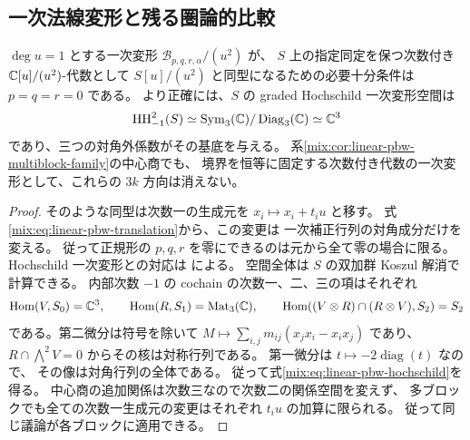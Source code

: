 \subsection{一次法線変形と残る圏論的比較}

\begin{proposition}[平行移動では消えない三方向]
\label{mix:prop:linear-pbw-first-normal-class}
$\deg u=1$ とする一次変形 $\mathcal B_{p,q,r,\alpha}/(u^2)$ が、
$S$ 上の指定同定を保つ次数付き $\mathbb C[u]/(u^2)$-代数として
$S[u]/(u^2)$ と同型になるための必要十分条件は $p=q=r=0$ である。
より正確には、$S$ の graded Hochschild 一次変形空間は
\begin{equation}\label{mix:eq:linear-pbw-hochschild}
 \operatorname{HH}^2_{-1}(S)
 \simeq \operatorname{Sym}_3(\mathbb C)/\operatorname{Diag}_3(\mathbb C)
 \simeq\mathbb C^3
\end{equation}
であり、三つの対角外係数がその基底を与える。
系\ref{mix:cor:linear-pbw-multiblock-family}の中心商でも、
境界を恒等に固定する次数付き代数の一次変形として、これらの $3k$ 方向は消えない。
\end{proposition}

\begin{proof}
そのような同型は次数一の生成元を $x_i\mapsto x_i+t_i u$ と移す。
式\eqref{mix:eq:linear-pbw-translation}から、この変更は
一次補正行列の対角成分だけを変える。
従って正規形の $p,q,r$ を零にできるのは元から全て零の場合に限る。
Hochschild 一次変形との対応は
\cite[Proposition~1.5(a)]{CMOBravermanGaitsgory}による。
空間全体は $S$ の双加群 Koszul 解消で計算できる。
内部次数 $-1$ の cochain の次数一、二、三の項はそれぞれ
\[
 \operatorname{Hom}(V,S_0)=\mathbb C^3,\qquad
 \operatorname{Hom}(R,S_1)=\operatorname{Mat}_3(\mathbb C),\qquad
 \operatorname{Hom}((V\otimes R)\cap(R\otimes V),S_2)=S_2
\]
である。第二微分は符号を除いて
$M\mapsto\sum_{i,j}m_{ij}(x_jx_i-x_ix_j)$ であり、
$R\cap\bigwedge^2V=0$ からその核は対称行列である。
第一微分は $t\mapsto-2\operatorname{diag}(t)$ なので、
その像は対角行列の全体である。
従って式\eqref{mix:eq:linear-pbw-hochschild}を得る。
中心商の追加関係は次数三なので次数二の関係空間を変えず、
多ブロックでも全ての次数一生成元の変更はそれぞれ $t_i u$ の加算に限られる。
従って同じ議論が各ブロックに適用できる。
\end{proof}

